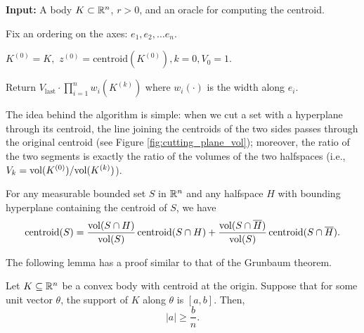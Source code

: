\begin{algorithm2e}[H]

\caption{$\mathtt{CuttingPlaneVolume}$}\label{alg:cutting-plane-volume}

\SetAlgoLined

\textbf{Input:} A body $K\subset\mathbb{R}^{n}$, $r>0$, and an oracle for
computing the centroid.

Fix an ordering on the axes: $e_{1},e_{2},\ldots e_{n}$.

$K^{(0)}=K,$ $z^{(0)}=\mbox{centroid}(K^{(0)}),k=0,V_{0}=1$.


Return $V_{\text{last}}\cdot\prod^{n}_{i=1}w_{i}(K^{(k)})$ where
$w_{i}(\cdot)$ is the width along $e_{i}$.

\end{algorithm2e}

The idea behind the algorithm is simple: when we cut a set with a
hyperplane through its centroid, the line joining the centroids of
the two sides passes through the original centroid (see Figure \ref{fig:cutting_plane_vol});
moreover, the ratio of the two segments is exactly the ratio of the
volumes of the two halfspaces (i.e., $V_{k}=\mathrm{vol}(K^{(0)})/\mathrm{vol}(K^{(k)})$).
\begin{lem}
\label{lem:centroid}For any measurable bounded set $S$ in $\mathbb{R}^{n}$
and any halfspace $H$ with bounding hyperplane containing the centroid
of $S$, we have 
\[
\mbox{centroid}(S)=\frac{\mathrm{vol}(S\cap H)}{\mathrm{vol}(S)}\,\mbox{centroid}(S\cap H)+\frac{\mathrm{vol}(S\cap\overline{H})}{\mathrm{vol}(S)}\,\mbox{centroid}(S\cap\overline{H}).
\]
\end{lem}

The following lemma has a proof similar to that of the Grunbaum theorem.
\begin{lem}
\label{lem:width}Let $K\subseteq\mathbb{R}^{n}$ be a convex body with centroid
at the origin. Suppose that for some unit vector $\theta$, the support
of $K$ along $\theta$ is $[a,b]$. Then, 
\[
|a|\ge\frac{b}{n}.
\]
\end{lem}

